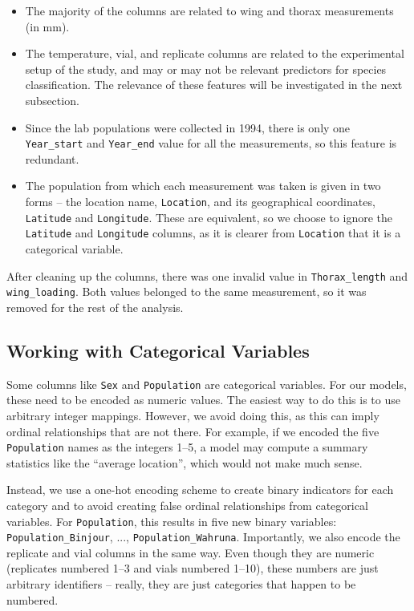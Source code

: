 \begin{itemize}
    \item The majority of the columns are related to wing and thorax measurements (in mm).
    \item The temperature, vial, and replicate columns are related to the experimental setup of the study, and may or may not be relevant predictors for species classification. The relevance of these features will be investigated in the next subsection.
    \item Since the lab populations were collected in 1994, there is only one \texttt{Year\_start} and \texttt{Year\_end} value for all the measurements, so this feature is redundant.
    \item The population from which each measurement was taken is given in two forms -- the location name, \texttt{Location}, and its geographical coordinates, \texttt{Latitude} and \texttt{Longitude}. These are equivalent, so we choose to ignore the \texttt{Latitude} and \texttt{Longitude} columns, as it is clearer from \texttt{Location} that it is a categorical variable.
\end{itemize}
After cleaning up the columns, there was one invalid value in \texttt{Thorax\_length} and \texttt{wing\_loading}. Both values belonged to the same measurement, so it was removed for the rest of the analysis.

\subsection{Working with Categorical Variables}

Some columns like \texttt{Sex} and \texttt{Population} are categorical variables. For our models, these need to be encoded as numeric values. The easiest way to do this is to use arbitrary integer mappings. However, we avoid doing this, as this can imply ordinal relationships that are not there. For example, if we encoded the five \texttt{Population} names as the integers 1--5, a model may compute a summary statistics like the ``average location'', which would not make much sense.

Instead, we use a one-hot encoding scheme to create binary indicators for each category and to avoid creating false ordinal relationships from categorical variables. For \texttt{Population}, this results in five new binary variables: \texttt{Population\_Binjour}, ..., \texttt{Population\_Wahruna}. Importantly, we also encode the replicate and vial columns in the same way. Even though they are numeric (replicates numbered 1--3 and vials numbered 1--10), these numbers are just arbitrary identifiers -- really, they are just categories that happen to be numbered.

